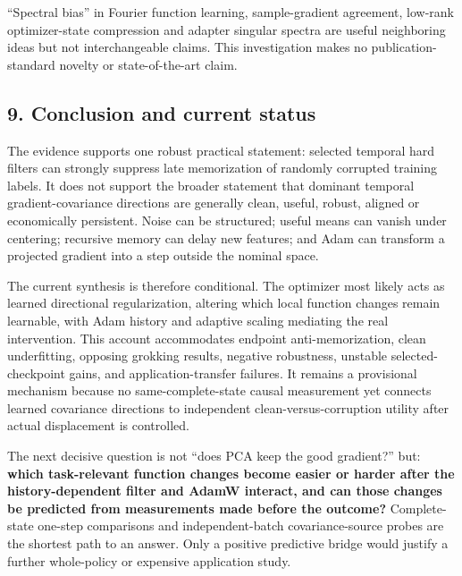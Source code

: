 \documentclass[
  british,
  10pt,
  a4paper,
]{article}
\begin{document}
``Spectral bias'' in Fourier function learning,
sample-\allowbreak{}gradient agreement, low-rank
optimizer-\allowbreak{}state compression and adapter singular spectra
are useful neighboring ideas but not interchangeable claims. This
investigation makes no publication-\allowbreak{}standard novelty or
state-\allowbreak{}of-\allowbreak{}the-\allowbreak{}art claim.

\subsection{9. Conclusion and current
status}\label{synthesis--conclusion-and-current-status}

The evidence supports one robust practical statement: selected temporal
hard filters can strongly suppress late memorization of randomly
corrupted training labels. It does not support the broader statement
that dominant temporal gradient-\allowbreak{}covariance directions are
generally clean, useful, robust, aligned or economically
persistent.\allowbreak{} Noise can be structured; useful means can
vanish under centering; recursive memory can delay new features; and
Adam can transform a projected gradient into a step outside the nominal
space.

The current synthesis is therefore conditional.\allowbreak{} The
optimizer most likely acts as learned directional
regularizati\allowbreak{}on,\allowbreak{} altering which local function
changes remain learnable, with Adam history and adaptive scaling
mediating the real intervention\allowbreak{}.\allowbreak{} This account
accommodates endpoint
anti-\allowbreak{}memorization\allowbreak{},\allowbreak{} clean
underfitting\allowbreak{},\allowbreak{} opposing grokking results,
negative robustness,\allowbreak{} unstable
selected-\allowbreak{}checkpoint gains, and
application-\allowbreak{}transfer failures. It remains a provisional
mechanism because no same-\allowbreak{}complete-\allowbreak{}state
causal measurement yet connects learned covariance directions to
independent clean-\allowbreak{}versus-\allowbreak{}corruption utility
after actual displacement is controlled.\allowbreak{}

The next decisive question is not ``does PCA keep the good gradient?''
but: \textbf{which task-\allowbreak{}relevant function changes become
easier or harder after the history-\allowbreak{}dependent filter and
AdamW interact, and can those changes be predicted from measurements
made before the outcome?} Complete-\allowbreak{}state one-step
comparisons and independent-\allowbreak{}batch
covariance-\allowbreak{}source probes are the shortest path to an
answer. Only a positive predictive bridge would justify a further
whole-\allowbreak{}policy or expensive application study.
\end{document}
